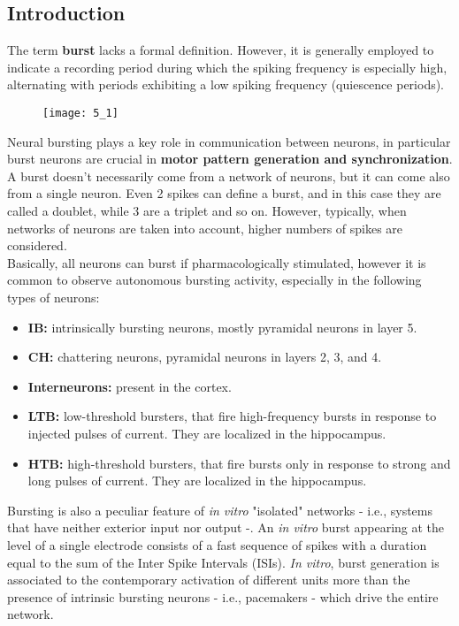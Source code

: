 \subsection{Introduction}
The term \textbf{burst} lacks a formal definition. However, it is generally employed to
indicate a recording period during which the spiking frequency is especially high,
alternating with periods exhibiting a low spiking frequency (quiescence periods).
\begin{figure}[H]
    \texttt{[image: 5\_1]}
    \centering
\end{figure}
Neural bursting plays a key role in communication between neurons, in particular
burst neurons are crucial in \textbf{motor pattern generation and synchronization}.
A burst doesn't necessarily come from a network of neurons, but it can come also from a
single neuron. Even 2 spikes can define a burst, and in this case they are called a doublet,
while 3 are a triplet and so on. However, typically, when networks of neurons are taken into
account, higher numbers of spikes are considered.\\
Basically, all neurons can burst if pharmacologically stimulated, however
it is common to observe autonomous bursting activity, especially in the following
types of neurons:
\begin{itemize}
    \item \textbf{IB:} intrinsically bursting neurons, mostly pyramidal neurons in
          layer 5.
    \item \textbf{CH:} chattering neurons, pyramidal neurons in layers 2, 3, and 4.
    \item \textbf{Interneurons:} present in the cortex.
    \item \textbf{LTB:} low-threshold bursters, that fire high-frequency bursts in
          response to injected pulses of current. They are localized in the hippocampus.
    \item \textbf{HTB:} high-threshold bursters, that fire bursts only in response to
          strong and long pulses of current. They are localized in the hippocampus.
\end{itemize}
Bursting is also a peculiar feature of \textit{in vitro} "isolated" networks - i.e., systems
that have neither exterior input nor output -.
An \textit{in vitro} burst appearing at the level of a single electrode consists of a fast
sequence of spikes with a duration equal to the sum of the Inter Spike Intervals (ISIs).
\textit{In vitro}, burst generation is associated to the contemporary activation of
different units more than the presence of intrinsic bursting neurons - i.e., pacemakers -
which drive the entire network.
